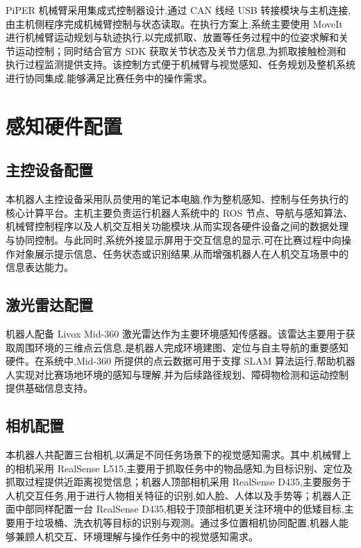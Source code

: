 \documentclass[12pt,hyperref,a4paper,UTF8]{ctexart}
\begin{document}
PiPER 机械臂采用集成式控制器设计,通过 CAN 线经 USB 转接模块与主机连接,由主机侧程序完成机械臂控制与状态读取。在执行方案上,系统主要使用 MoveIt 进行机械臂运动规划与轨迹执行,以完成抓取、放置等任务过程中的位姿求解和关节运动控制；同时结合官方 SDK 获取关节状态及关节力信息,为抓取接触检测和执行过程监测提供支持。该控制方式便于机械臂与视觉感知、任务规划及整机系统进行协同集成,能够满足比赛任务中的操作需求。

\section{感知硬件配置}

\subsection{主控设备配置}

本机器人主控设备采用队员使用的笔记本电脑,作为整机感知、控制与任务执行的核心计算平台。主机主要负责运行机器人系统中的 ROS 节点、导航与感知算法、机械臂控制程序以及人机交互相关功能模块,从而实现各硬件设备之间的数据处理与协同控制。与此同时,系统外接显示屏用于交互信息的显示,可在比赛过程中向操作对象展示提示信息、任务状态或识别结果,从而增强机器人在人机交互场景中的信息表达能力。

\subsection{激光雷达配置}

机器人配备 Livox Mid-360 激光雷达作为主要环境感知传感器。该雷达主要用于获取周围环境的三维点云信息,是机器人完成环境建图、定位与自主导航的重要感知硬件。在系统中,Mid-360 所提供的点云数据可用于支撑 SLAM 算法运行,帮助机器人实现对比赛场地环境的感知与理解,并为后续路径规划、障碍物检测和运动控制提供基础信息支持。

\subsection{相机配置}

本机器人共配置三台相机,以满足不同任务场景下的视觉感知需求。其中,机械臂上的相机采用 RealSense L515,主要用于抓取任务中的物品感知,为目标识别、定位及抓取过程提供近距离视觉信息；机器人顶部相机采用 RealSense D435,主要服务于人机交互任务,用于进行人物相关特征的识别,如人脸、人体以及手势等；机器人正面中部同样配置一台 RealSense D435,相较于顶部相机更关注环境中的低矮目标,主要用于垃圾桶、洗衣机等目标的识别与观测。通过多位置相机协同配置,机器人能够兼顾人机交互、环境理解与操作任务中的视觉感知需求。
\end{document}
